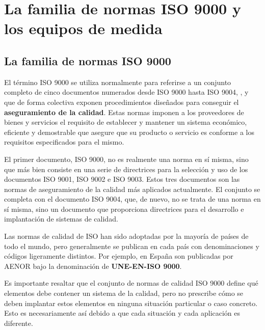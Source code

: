 
\chapter{La familia de normas ISO 9000 y los equipos de medida}


\section{La familia de normas ISO 9000}

El término ISO 9000 se utiliza normalmente para referirse a un conjunto completo de cinco documentos numerados desde ISO 9000 hasta ISO 9004, \parencite{UNE-EN-ISO-9000}, y que de forma colectiva exponen procedimientos diseñados para conseguir el \textbf{aseguramiento de la calidad}. Estas normas imponen a los proveedores de bienes y servicios el requisito de establecer y mantener un sistema económico, eficiente y demostrable que asegure que su producto o servicio es conforme a los requisitos especificados para el mismo.

El primer documento, ISO 9000, no es realmente una norma en sí misma, sino que más bien consiste en una serie de directrices para la selección y uso de los documentos ISO 9001, ISO 9002 e ISO 9003. Estos tres documentos son las normas de aseguramiento de la calidad más aplicados actualmente. El conjunto se completa con el documento ISO 9004, que, de nuevo, no se trata de una norma en sí misma, sino un documento que proporciona directrices para el desarrollo e implantación de sistemas de calidad.

Las normas de calidad de ISO han sido adoptadas por la mayoría de países de todo el mundo, pero generalmente se publican en cada país con denominaciones y códigos ligeramente distintos. Por ejemplo, en España son publicadas por AENOR bajo la denominación de \textbf{UNE-EN-ISO 9000}.

\begin{parrafoDestacado}
Es importante resaltar que el conjunto de normas de calidad ISO 9000 define qué elementos debe contener un sistema de la calidad, pero no prescribe cómo se deben implantar estos elementos en ninguna situación particular o caso concreto. Esto es necesariamente así debido a que cada situación y cada aplicación es diferente.
\end{parrafoDestacado}


